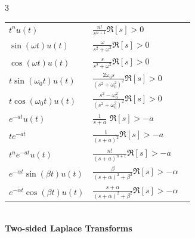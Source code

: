 \documentclass[10pt,landscape]{article}
\begin{document}
\begin{multicols}{3}
{\begin{tabularx}{\columnwidth}{l X X}
    $t^nu(t)$ &
    $\displaystyle\frac{n!}{s^{n+1}}$\hfill $\Re[s]>0$  \\[10pt]
    
    $\sin(\omega t)u(t)$ &
    $\displaystyle \frac{\omega}{s^2+\omega^2}$\hfill $\Re[s] >0$ \\[10pt]
    
    $\cos(\omega t)u(t)$ &
    $\displaystyle\frac{s}{s^2+\omega^2}$\hfill $\Re[s] >0$ \\[10pt]
    
    $t\sin(\omega_0 t)u(t)$ &
    $\displaystyle\frac{2\omega_0 s}{(s^2+\omega_0^2)^2}$\hfill $\Re[s] >0$ \\[10pt]
    
    $t\cos(\omega_0 t)u(t)$ &
    $\displaystyle\frac{s^2-\omega_0^2}{(s^2+\omega_0^2)^2}$\hfill $\Re[s] >0$ \\[10pt]
    
    $e^{-a t}u(t)$ &
    $\displaystyle \frac{1}{s+a}$ \hfill $\Re[s]>-a$  \\[10pt]
    
    $te^{-a t}$ &
    $\displaystyle\frac{1}{(s+a)^2}$\hfill $\Re[s]>-a$  \\[10pt]
    
    $t^n e^{-at}u(t)$ &
    $\displaystyle\frac{n!}{(s+a)^{n+1}}$\hfill $\Re[s]>-a$  \\[10pt]
    
    $e^{-\alpha t}\sin(\beta t)u(t)$ &
    $\displaystyle \frac{\beta}{(s+\alpha)^2+\beta^2}$\hfill $\Re[s]>-\alpha$  \\[10pt]
    
    $e^{-\alpha t}\cos(\beta t)u(t)$ &
    $\displaystyle\frac{s+\alpha}{(s+\alpha)^2+\beta^2}$\hfill $\Re[s]>-\alpha$  \\[10pt]
    
    
    \end{tabularx}}\\[6pt]
    \textbf{\normalsize Two-sided Laplace Transforms}\\[6pt]
    
\end{multicols}
\end{document}
